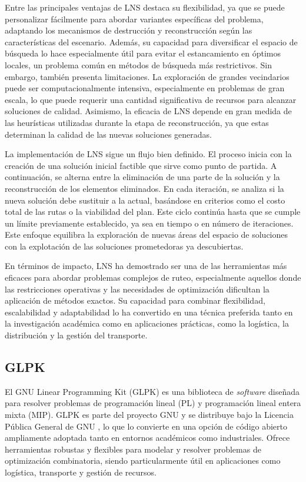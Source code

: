 \documentclass{article}
\begin{document}
Entre las principales ventajas de LNS destaca su flexibilidad, ya que se puede personalizar fácilmente para abordar variantes específicas del problema, adaptando los mecanismos de destrucción y reconstrucción según las características del escenario. Además, su capacidad para diversificar el espacio de búsqueda lo hace especialmente útil para evitar el estancamiento en óptimos locales, un problema común en métodos de búsqueda más restrictivos. Sin embargo, también presenta limitaciones. La exploración de grandes vecindarios puede ser computacionalmente intensiva, especialmente en problemas de gran escala, lo que puede requerir una cantidad significativa de recursos para alcanzar soluciones de calidad. Asimismo, la eficacia de LNS depende en gran medida de las heurísticas utilizadas durante la etapa de reconstrucción, ya que estas determinan la calidad de las nuevas soluciones generadas.\cite{ref4}

La implementación de LNS sigue un flujo bien definido. El proceso inicia con la creación de una solución inicial factible que sirve como punto de partida. A continuación, se alterna entre la eliminación de una parte de la solución y la reconstrucción de los elementos eliminados. En cada iteración, se analiza si la nueva solución debe sustituir a la actual, basándose en criterios como el costo total de las rutas o la viabilidad del plan. Este ciclo continúa hasta que se cumple un límite previamente establecido, ya sea en tiempo o en número de iteraciones. Este enfoque equilibra la exploración de nuevas áreas del espacio de soluciones con la explotación de las soluciones prometedoras ya descubiertas.

En términos de impacto, LNS ha demostrado ser una de las herramientas más eficaces para abordar problemas complejos de ruteo, especialmente aquellos donde las restricciones operativas y las necesidades de optimización dificultan la aplicación de métodos exactos. Su capacidad para combinar flexibilidad, escalabilidad y adaptabilidad lo ha convertido en una técnica preferida tanto en la investigación académica como en aplicaciones prácticas, como la logística, la distribución y la gestión del transporte.

\subsection{GLPK}
El GNU Linear Programming Kit (GLPK) es una biblioteca de \textit{software} diseñada para resolver problemas de programación lineal (PL) y programación lineal entera mixta (MIP)\cite{ref19}. GLPK es parte del proyecto GNU y se distribuye bajo la Licencia Pública General de GNU \cite{ref21}, lo que lo convierte en una opción de código abierto ampliamente adoptada tanto en entornos académicos como industriales. Ofrece herramientas robustas y flexibles para modelar y resolver problemas de optimización combinatoria, siendo particularmente útil en aplicaciones como logística, transporte y gestión de recursos.
\end{document}

